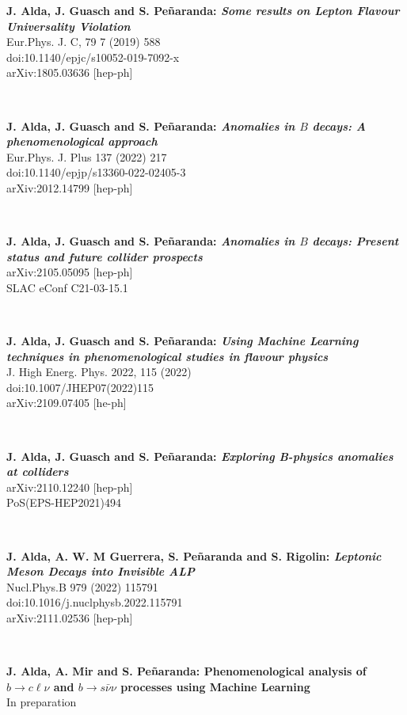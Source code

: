 \documentclass{cvf}
\begin{document}

\hspace{\parindent}
\textbf{J. Alda, J. Guasch and S. Peñaranda: \textit{Some results on Lepton Flavour Universality Violation}}\\
Eur.Phys. J. C, 79 7 (2019) 588\\
doi:10.1140/epjc/s10052-019-7092-x\\
arXiv:1805.03636 [hep-ph]

~

\textbf{J. Alda, J. Guasch and S. Peñaranda: \textit{Anomalies in $B$ decays: A phenomenological approach}}\\
Eur.Phys. J. Plus 137 (2022) 217\\
doi:10.1140/epjp/s13360-022-02405-3\\
arXiv:2012.14799 [hep-ph]

~

\textbf{J. Alda, J. Guasch and S. Peñaranda: \textit{Anomalies in $B$ decays: Present status and future collider prospects}}\\
arXiv:2105.05095 [hep-ph]\\
SLAC eConf C21-03-15.1

~

\textbf{J. Alda, J. Guasch and S. Peñaranda: \textit{Using Machine Learning techniques in phenomenological studies in flavour physics}}\\
J. High Energ. Phys. 2022, 115 (2022)\\
doi:10.1007/JHEP07(2022)115\\
arXiv:2109.07405 [he-ph]

~

\textbf{J. Alda, J. Guasch and S. Peñaranda: \textit{Exploring B-physics anomalies at colliders}}\\
arXiv:2110.12240 [hep-ph]\\
PoS(EPS-HEP2021)494

~

\textbf{J. Alda, A. W. M Guerrera, S. Peñaranda and S. Rigolin: \textit{Leptonic Meson Decays into Invisible ALP}}\\
Nucl.Phys.B 979 (2022) 115791\\
doi:10.1016/j.nuclphysb.2022.115791\\
arXiv:2111.02536 [hep-ph]

~

\textbf{J. Alda, A. Mir and S. Peñaranda: {Phenomenological analysis of $b\to c \ell \nu$ and $b\to s \bar{\nu}\nu$ processes using Machine Learning}}\\
In preparation
\end{document}
